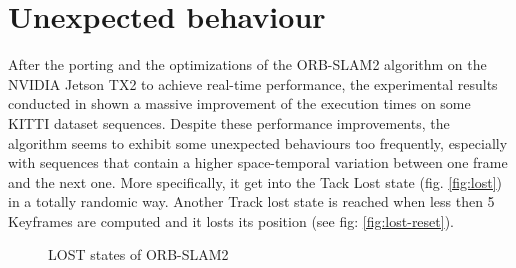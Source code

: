 

\section{Unexpected behaviour}
After the porting and the optimizations of the ORB-SLAM2 algorithm on the NVIDIA Jetson TX2 to achieve real-time performance, the experimental results conducted in \cite{iros2019} shown a massive improvement of the execution times on some KITTI dataset sequences.
Despite these performance improvements, the algorithm seems to exhibit some unexpected behaviours too frequently, especially with sequences that contain a higher space-temporal variation between one frame and the next one. More specifically, it get into the Tack Lost state (fig. \ref{fig:lost})  in a totally randomic way. Another Track lost state is reached when less then 5 Keyframes are computed and it losts its position (see fig: \ref{fig:lost-reset}).

\begin{figure}
	\centering
	 \par
	\caption{LOST states of ORB-SLAM2}
\end{figure}




